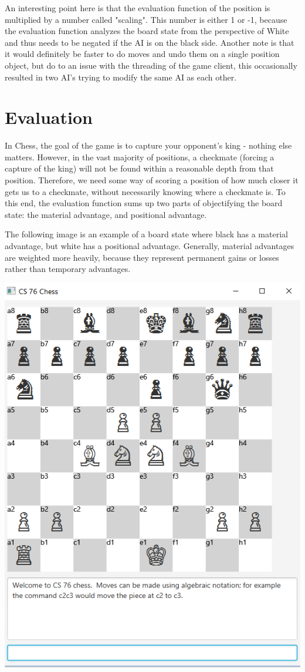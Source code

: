 \documentclass[10pt]{article}
\begin{document}
An interesting point here is that the evaluation function of the position is multiplied by a number called "scaling". This number is either 1 or -1, because the evaluation function analyzes the board state from the perspective of White and thus needs to be negated if the AI is on the black side. Another note is that it would definitely be faster to do moves and undo them on a single position object, but do to an issue with the threading of the game client, this occasionally resulted in two AI's trying to modify the same AI as each other.

\section{Evaluation}

In Chess, the goal of the game is to capture your opponent's king - nothing else matters. However, in the vast majority of positions, a checkmate (forcing a capture of the king) will not be found within a reasonable depth from that position. Therefore, we need some way of scoring a position of how much closer it gets us to a checkmate, without necessarily knowing where a checkmate is. To this end, the evaluation function sums up two parts of objectifying the board state: the material advantage, and positional advantage. 

The following image is an example of a board state where black has a material advantage, but white has a positional advantage. Generally, material advantages are weighted more heavily, because they represent permanent gains or losses rather than temporary advantages.

\includegraphics[scale=0.4]{Heuristic1}
\end{document}
